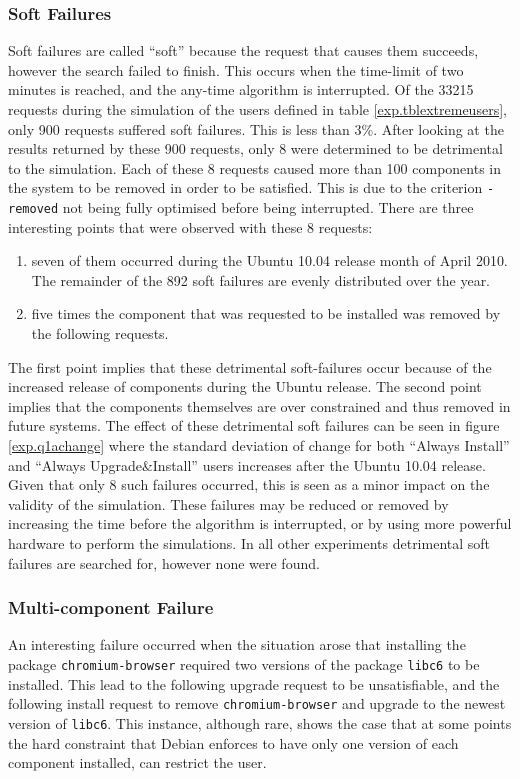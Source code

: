 \subsubsection{Soft Failures}
Soft failures are called ``soft'' because the request that causes them succeeds, however the search failed to finish.
This occurs when the time-limit of two minutes is reached, and the any-time algorithm is interrupted.
Of the 33215 requests during the simulation of the users defined in table \ref{exp.tblextremeusers},
only 900 requests suffered soft failures.
This is less than 3\%.
After looking at the results returned by these 900 requests,
only 8 were determined to be detrimental to the simulation.
Each of these 8 requests caused more than 100 components in the system to be removed in order to be satisfied.
This is due to the criterion \texttt{-removed} not being fully optimised before being interrupted.
There are three interesting points that were observed with these 8 requests:
\begin{enumerate}
  \item seven of them occurred during the Ubuntu 10.04 release month of April 2010. The remainder of the 892 soft failures are evenly distributed over the year.
  \item five times the component that was requested to be installed was removed by the following requests.
\end{enumerate}
The first point implies that these detrimental soft-failures occur because of the increased release of components during the Ubuntu release.
The second point implies that the components themselves are over constrained and thus removed in future systems.
The effect of these detrimental soft failures can be seen in figure \ref{exp.q1achange} 
where the standard deviation of change for both ``Always Install'' and ``Always Upgrade\&Install'' users increases after the Ubuntu 10.04 release.
Given that only 8 such failures occurred, this is seen as a minor impact on the validity of the simulation.
These failures may be reduced or removed by increasing the time before the algorithm is interrupted, or by using more powerful hardware to perform the simulations.
In all other experiments detrimental soft failures are searched for, however none were found.

\subsubsection{Multi-component Failure}
An interesting failure occurred when the situation arose that installing the package \texttt{chromium-browser} required two versions of the package \texttt{libc6} to be installed. 
This lead to the following upgrade request to be unsatisfiable, and the following install request to remove \texttt{chromium-browser} and upgrade to the newest version of \texttt{libc6}.
This instance, although rare, shows the case that at some points the hard constraint that Debian enforces to have only one version of each component installed,
can restrict the user.

